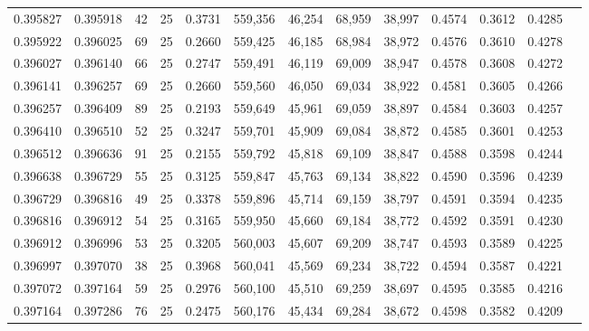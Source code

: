 \begin{tabular}{rrrrrrrrrrrrr}
0.395827 & 0.395918 &    42 &  25 &                                     0.3731 & 559,356 &  46,254 &  68,959 &  38,997 & 0.4574 & 0.3612 & 0.4285 \\
0.395922 & 0.396025 &    69 &  25 &                                     0.2660 & 559,425 &  46,185 &  68,984 &  38,972 & 0.4576 & 0.3610 & 0.4278 \\
0.396027 & 0.396140 &    66 &  25 &                                     0.2747 & 559,491 &  46,119 &  69,009 &  38,947 & 0.4578 & 0.3608 & 0.4272 \\
0.396141 & 0.396257 &    69 &  25 &                                     0.2660 & 559,560 &  46,050 &  69,034 &  38,922 & 0.4581 & 0.3605 & 0.4266 \\
0.396257 & 0.396409 &    89 &  25 &                                     0.2193 & 559,649 &  45,961 &  69,059 &  38,897 & 0.4584 & 0.3603 & 0.4257 \\
0.396410 & 0.396510 &    52 &  25 &                                     0.3247 & 559,701 &  45,909 &  69,084 &  38,872 & 0.4585 & 0.3601 & 0.4253 \\
0.396512 & 0.396636 &    91 &  25 &                                     0.2155 & 559,792 &  45,818 &  69,109 &  38,847 & 0.4588 & 0.3598 & 0.4244 \\
0.396638 & 0.396729 &    55 &  25 &                                     0.3125 & 559,847 &  45,763 &  69,134 &  38,822 & 0.4590 & 0.3596 & 0.4239 \\
0.396729 & 0.396816 &    49 &  25 &                                     0.3378 & 559,896 &  45,714 &  69,159 &  38,797 & 0.4591 & 0.3594 & 0.4235 \\
0.396816 & 0.396912 &    54 &  25 &                                     0.3165 & 559,950 &  45,660 &  69,184 &  38,772 & 0.4592 & 0.3591 & 0.4230 \\
0.396912 & 0.396996 &    53 &  25 &                                     0.3205 & 560,003 &  45,607 &  69,209 &  38,747 & 0.4593 & 0.3589 & 0.4225 \\
0.396997 & 0.397070 &    38 &  25 &                                     0.3968 & 560,041 &  45,569 &  69,234 &  38,722 & 0.4594 & 0.3587 & 0.4221 \\
0.397072 & 0.397164 &    59 &  25 &                                     0.2976 & 560,100 &  45,510 &  69,259 &  38,697 & 0.4595 & 0.3585 & 0.4216 \\
0.397164 & 0.397286 &    76 &  25 &                                     0.2475 & 560,176 &  45,434 &  69,284 &  38,672 & 0.4598 & 0.3582 & 0.4209 \\

\end{tabular}
